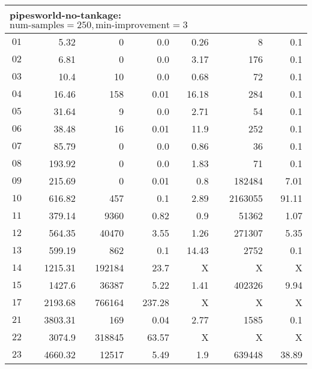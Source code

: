 \begin{longtable}{|c||r|r|r||r|r|r|}
\multicolumn{7}{|l|}{pipesworld-no-tankage: $\text{num-samples}=250,\text{min-improvement}=3$}\\\hline
$01$ & 5.32 & 0 & 0.0 & 0.26 & 8 & 0.1 \\\hline
$02$ & 6.81 & 0 & 0.0 & 3.17 & 176 & 0.1 \\\hline
$03$ & 10.4 & 10 & 0.0 & 0.68 & 72 & 0.1 \\\hline
$04$ & 16.46 & 158 & 0.01 & 16.18 & 284 & 0.1 \\\hline
$05$ & 31.64 & 9 & 0.0 & 2.71 & 54 & 0.1 \\\hline
$06$ & 38.48 & 16 & 0.01 & 11.9 & 252 & 0.1 \\\hline
$07$ & 85.79 & 0 & 0.0 & 0.86 & 36 & 0.1 \\\hline
$08$ & 193.92 & 0 & 0.0 & 1.83 & 71 & 0.1 \\\hline
$09$ & 215.69 & 0 & 0.01 & 0.8 & 182484 & 7.01 \\\hline
$10$ & 616.82 & 457 & 0.1 & 2.89 & 2163055 & 91.11 \\\hline
$11$ & 379.14 & 9360 & 0.82 & 0.9 & 51362 & 1.07 \\\hline
$12$ & 564.35 & 40470 & 3.55 & 1.26 & 271307 & 5.35 \\\hline
$13$ & 599.19 & 862 & 0.1 & 14.43 & 2752 & 0.1 \\\hline
$14$ & 1215.31 & 192184 & 23.7 & X & X & X \\\hline
$15$ & 1427.6 & 36387 & 5.22 & 1.41 & 402326 & 9.94 \\\hline
$17$ & 2193.68 & 766164 & 237.28 & X & X & X \\\hline
$21$ & 3803.31 & 169 & 0.04 & 2.77 & 1585 & 0.1 \\\hline
$22$ & 3074.9 & 318845 & 63.57 & X & X & X \\\hline
$23$ & 4660.32 & 12517 & 5.49 & 1.9 & 639448 & 38.89 \\\hline


\end{longtable}
